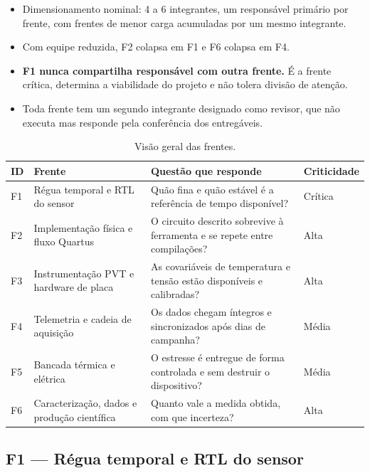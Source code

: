 \documentclass[11pt,a4paper]{article}
\begin{document}
\begin{itemize}
  \item Dimensionamento nominal: 4 a 6 integrantes, um responsável primário por frente,
        com frentes de menor carga acumuladas por um mesmo integrante.
  \item Com equipe reduzida, F2 colapsa em F1 e F6 colapsa em F4.
  \item \textbf{F1 nunca compartilha responsável com outra frente.} É a frente crítica,
        determina a viabilidade do projeto e não tolera divisão de atenção.
  \item Toda frente tem um segundo integrante designado como revisor, que não executa
        mas responde pela conferência dos entregáveis.
\end{itemize}

\begin{table}[htbp]
\centering
\caption{Visão geral das frentes.}
\label{tab:frentes}
\small
\begin{tabularx}{\textwidth}{@{}L{1.0cm} L{4.3cm} X C{1.9cm}@{}}
\toprule
\textbf{ID} & \textbf{Frente} & \textbf{Questão que responde} & \textbf{Criticidade} \\
\midrule
F1 & Régua temporal e RTL do sensor & Quão fina e quão estável é a referência de tempo disponível? & Crítica \\
F2 & Implementação física e fluxo Quartus & O circuito descrito sobrevive à ferramenta e se repete entre compilações? & Alta \\
F3 & Instrumentação PVT e hardware de placa & As covariáveis de temperatura e tensão estão disponíveis e calibradas? & Alta \\
F4 & Telemetria e cadeia de aquisição & Os dados chegam íntegros e sincronizados após dias de campanha? & Média \\
F5 & Bancada térmica e elétrica & O estresse é entregue de forma controlada e sem destruir o dispositivo? & Média \\
F6 & Caracterização, dados e produção científica & Quanto vale a medida obtida, com que incerteza? & Alta \\
\bottomrule
\end{tabularx}
\end{table}

\subsection{F1 --- Régua temporal e RTL do sensor}
\end{document}
